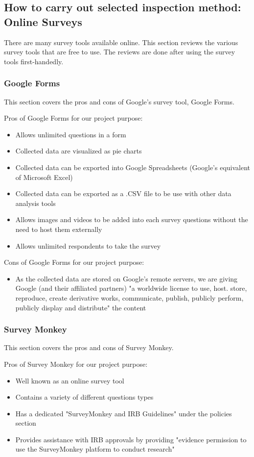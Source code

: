 \documentclass[10pt,journal,compsoc,draftclsnofoot]{IEEEtran}
\begin{document}
\newpage

\subsection{How to carry out selected inspection method: Online Surveys}
There are many survey tools available online.
This section reviews the various survey tools that are free to use.
The reviews are done after using the survey tools first-handedly.

\subsubsection{Google Forms}
This section covers the pros and cons of Google's survey tool, Google Forms.

Pros of Google Forms for our project purpose:
\begin{itemize}
\item Allows unlimited questions in a form
\item Collected data are visualized as pie charts
\item Collected data can be exported into Google Spreadsheets (Google's equivalent of Microsoft Excel)
\item Collected data can be exported as a .CSV file to be use with other data analysis tools
\item Allows images and videos to be added into each survey questions without the need to host them externally
\item Allows unlimited respondents to take the survey
\end{itemize}

Cons of Google Forms for our project purpose:
\begin{itemize}
\item As the collected data are stored on Google's remote servers, we are giving Google (and their affiliated partners) "a worldwide license to use, host. store, reproduce, create derivative works, communicate, publish, publicly perform, publicly display and distribute" the content \cite{google}
\end{itemize}

\subsubsection{Survey Monkey}
This section covers the pros and cons of Survey Monkey.

Pros of Survey Monkey for our project purpose:
\begin{itemize}
\item Well known as an online survey tool
\item Contains a variety of different questions types
\item Has a dedicated "SurveyMonkey and IRB Guidelines" under the policies section
\item Provides assistance with IRB approvals by providing "evidence permission to use the SurveyMonkey platform to conduct research" \cite{surveymonkey}
\end{itemize}
\end{document}
